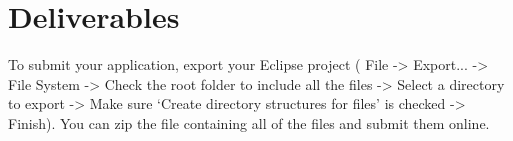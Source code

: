 \section{Deliverables}

To submit your application, export your Eclipse project ( File -> Export... -> File System -> Check the root folder to include all the files -> Select a directory to export -> Make sure ‘Create directory structures for files’ is checked -> Finish).
You can zip the file containing all of the files and submit them online.
